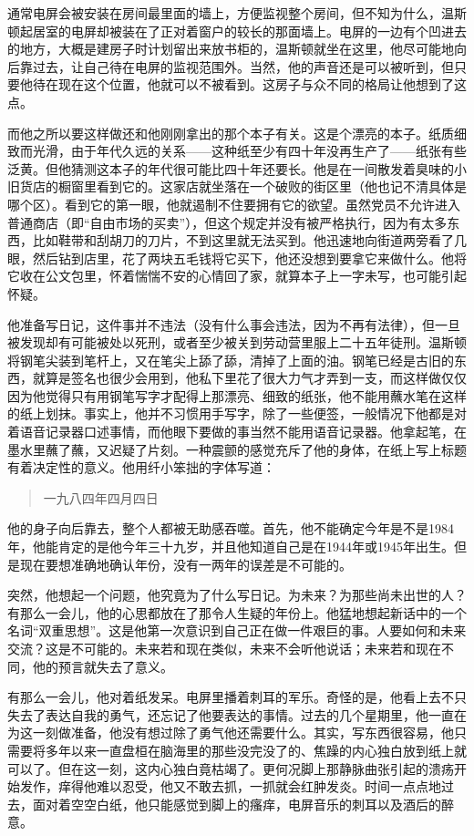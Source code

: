 通常电屏会被安装在房间最里面的墙上，方便监视整个房间，但不知为什么，温斯顿起居室的电屏却被装在了正对着窗户的较长的那面墙上。电屏的一边有个凹进去的地方，大概是建房子时计划留出来放书柜的，温斯顿就坐在这里，他尽可能地向后靠过去，让自己待在电屏的监视范围外。当然，他的声音还是可以被听到，但只要他待在现在这个位置，他就可以不被看到。这房子与众不同的格局让他想到了这点。

而他之所以要这样做还和他刚刚拿出的那个本子有关。这是个漂亮的本子。纸质细致而光滑，由于年代久远的关系——这种纸至少有四十年没再生产了——纸张有些泛黄。但他猜测这本子的年代很可能比四十年还要长。他是在一间散发着臭味的小旧货店的橱窗里看到它的。这家店就坐落在一个破败的街区里（他也记不清具体是哪个区）。看到它的第一眼，他就遏制不住要拥有它的欲望。虽然党员不允许进入普通商店（即``自由市场的买卖''），但这个规定并没有被严格执行，因为有太多东西，比如鞋带和刮胡刀的刀片，不到这里就无法买到。他迅速地向街道两旁看了几眼，然后钻到店里，花了两块五毛钱将它买下，他还没想到要拿它来做什么。他将它收在公文包里，怀着惴惴不安的心情回了家，就算本子上一字未写，也可能引起怀疑。

他准备写日记，这件事并不违法（没有什么事会违法，因为不再有法律），但一旦被发现却有可能被处以死刑，或者至少被关到劳动营里服上二十五年徒刑。温斯顿将钢笔尖装到笔杆上，又在笔尖上舔了舔，清掉了上面的油。钢笔已经是古旧的东西，就算是签名也很少会用到，他私下里花了很大力气才弄到一支，而这样做仅仅因为他觉得只有用钢笔写字才配得上那漂亮、细致的纸张，他不能用蘸水笔在这样的纸上划抹。事实上，他并不习惯用手写字，除了一些便签，一般情况下他都是对着语音记录器口述事情，而他眼下要做的事当然不能用语音记录器。他拿起笔，在墨水里蘸了蘸，又迟疑了片刻。一种震颤的感觉充斥了他的身体，在纸上写上标题有着决定性的意义。他用纤小笨拙的字体写道：

\begin{quotation}
一九八四年四月四日
\end{quotation}

他的身子向后靠去，整个人都被无助感吞噬。首先，他不能确定今年是不是1984年，他能肯定的是他今年三十九岁，并且他知道自己是在1944年或1945年出生。但是现在要想准确地确认年份，没有一两年的误差是不可能的。

突然，他想起一个问题，他究竟为了什么写日记。为未来？为那些尚未出世的人？有那么一会儿，他的心思都放在了那令人生疑的年份上。他猛地想起新话中的一个名词``双重思想''。这是他第一次意识到自己正在做一件艰巨的事。人要如何和未来交流？这是不可能的。未来若和现在类似，未来不会听他说话；未来若和现在不同，他的预言就失去了意义。

有那么一会儿，他对着纸发呆。电屏里播着刺耳的军乐。奇怪的是，他看上去不只失去了表达自我的勇气，还忘记了他要表达的事情。过去的几个星期里，他一直在为这一刻做准备，他没有想过除了勇气他还需要什么。其实，写东西很容易，他只需要将多年以来一直盘桓在脑海里的那些没完没了的、焦躁的内心独白放到纸上就可以了。但在这一刻，这内心独白竟枯竭了。更何况脚上那静脉曲张引起的溃疡开始发作，痒得他难以忍受，他又不敢去抓，一抓就会红肿发炎。时间一点点地过去，面对着空空白纸，他只能感觉到脚上的瘙痒，电屏音乐的刺耳以及酒后的醉意。

